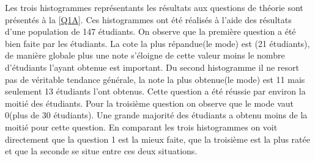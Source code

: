 \documentclass[a4paper, 11pt]{article}
\begin{document}
 Les trois histogrammes représentants les résultats aux questions de théorie sont présentés à la  \ref{Q1A}. Ces histogrammes ont été réalisés à l'aide des résultats d'une population de 147 étudiants. On observe que la première question a été bien faite par les étudiants. La cote la plus répandue(le mode) est (21 étudiants), de manière globale plus une note s'éloigne de cette valeur moins le nombre d'étudiants l'ayant obtenue est important. Du second histogramme il ne resort pas de véritable tendance générale, la note la plus obtenue(le mode) est 11 mais seulement 13 étudiants l'ont obtenus. Cette question a été réussie par environ la moitié des étudiants. Pour la troisième question on observe que le mode vaut 0(plus de 30 étudiants). Une grande majorité des étudiants a obtenu moins de la moitié pour cette question. En comparant les trois histogrammes on voit directement que la question 1 est la mieux faite, que la troisième est la plus ratée et que la seconde se situe entre ces deux situations.
\end{document}
